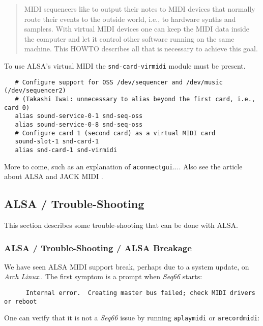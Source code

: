    \begin{quote}
   MIDI sequencers like to output their notes to MIDI devices that normally
   route their events to the outside world, i.e., to hardware synths and
   samplers. With virtual MIDI devices one can keep the MIDI data inside the
   computer and let it control other software running on the same machine. This
   HOWTO describes all that is necessary to achieve this goal.
   \end{quote}

   To use ALSA's virtual MIDI the
   \texttt{snd-card-virmidi} module must be present. 

   \begin{verbatim}
   # Configure support for OSS /dev/sequencer and /dev/music (/dev/sequencer2)
   # (Takashi Iwai: unnecessary to alias beyond the first card, i.e., card 0)
   alias sound-service-0-1 snd-seq-oss
   alias sound-service-0-8 snd-seq-oss
   # Configure card 1 (second card) as a virtual MIDI card
   sound-slot-1 snd-card-1
   alias snd-card-1 snd-virmidi
   \end{verbatim}

   More to come, such as an explanation of \texttt{aconnectgui}....
   Also see the article about ALSA and JACK MIDI \cite{midilinux}.

\subsection{ALSA / Trouble-Shooting}
\label{subsec:alsa_testing}

   This section describes some trouble-shooting that can be done with ALSA.

\subsubsection{ALSA / Trouble-Shooting / ALSA Breakage}
\label{subsubsec:alsa_testing_alsa_breakage}

   We have seen ALSA MIDI support break, perhaps due to a system update, on
   \textsl{Arch Linux}..
   The first symptom is a prompt when \textsl{Seq66} starts:

   \begin{verbatim}
      Internal error.  Creating master bus failed; check MIDI drivers or reboot
   \end{verbatim}

   One can verify that it is not a \textsl{Seq66} issue by running
   \texttt{aplaymidi} or \texttt{arecordmidi}:

